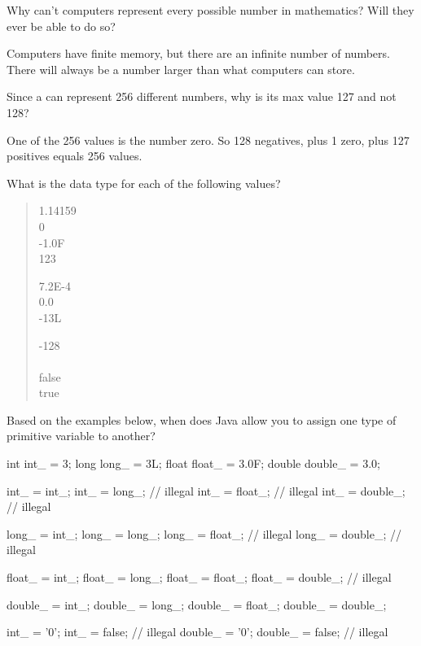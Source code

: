 \Q Why can't computers represent every possible number in mathematics? Will they ever be able to do so?

\begin{answer}
Computers have finite memory, but there are an infinite number of numbers.
There will always be a number larger than what computers can store.
\end{answer}


\Q Since a  can represent 256 different numbers, why is its max value 127 and not 128?

\begin{answer}
One of the 256 values is the number zero. So 128 negatives, plus 1 zero, plus 127 positives equals 256 values.
\end{answer}


\newpage

\Q \label{literals}
What is the data type for each of the following values?

\begin{quote}
\begin{multicols}{3}
1.14159      \\[1ex]
0               \\[1ex]
-1.0F         \\[1ex]
123        

7.2E-4       \\[1ex]
0.0          \\[1ex]
-13L           \\[1ex]
\qs  {}

-128            \\[1ex]
\qs  {}    \\[1ex]
false       \\[1ex]
true       
\end{multicols}
\end{quote}


\Q \label{allowed}
Based on the examples below, when does Java allow you to assign one type of primitive variable to another?

\begin{multicols}{2}
\begin{javalst}
    int int_ = 3;
    long long_ = 3L;
    float float_ = 3.0F;
    double double_ = 3.0;
    
    int_ = int_;
    int_ = long_;      // illegal
    int_ = float_;     // illegal
    int_ = double_;    // illegal
    
    long_ = int_;
    long_ = long_;
    long_ = float_;    // illegal
    long_ = double_;   // illegal

    float_ = int_;
    float_ = long_;
    float_ = float_;
    float_ = double_;  // illegal
    
    double_ = int_;
    double_ = long_;
    double_ = float_;
    double_ = double_;
    
    int_ = '0';
    int_ = false;      // illegal
    double_ = '0';
    double_ = false;   // illegal
\end{javalst}
\end{multicols}

